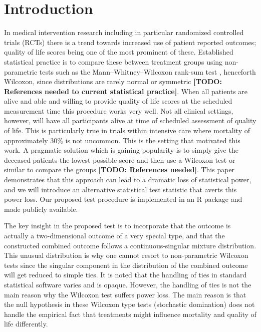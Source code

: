 \section{Introduction}

In medical intervention research including in particular randomized controlled trials (RCTs) there is a trend towards increased use of patient reported outcomes; quality of life scores being one of the most prominent of these. Established statistical practice is to compare these between treatment groups using non-parametric tests such as the Mann--Whitney--Wilcoxon rank-sum test \citep{wilcoxon3001968individual,mann1947test}, henceforth Wilcoxon, since distributions are rarely normal or symmetric \textbf{[TODO: References needed to current statistical practice]}. When all patients are alive and able and willing to provide quality of life scores at the scheduled measurement time this procedure works very well. Not all clinical settings, however, will have all participants alive at time of scheduled assessment of quality of life. This is particularly true in trials within intensive care where mortality of approximately 30\% is not uncommon. This is the setting that motivated this work. A pragmatic solution which is gaining popularity is to simply give the deceased patients the lowest possible score and then use a Wilcoxon test or similar to compare the groups \textbf{[TODO: References needed]}. This paper demonstrates that this approach can lead to a dramatic loss of statistical power, and we will introduce an alternative statistical test statistic that averts this power loss. Our proposed test procedure is implemented in an R package and made publicly available.

The key insight in the proposed test is to incorporate that the outcome is actually a two-dimensional outcome of a very special type, and that the constructed combined outcome follows a continuous-singular mixture distribution. This unusual distribution is why one cannot resort to non-parametric Wilcoxon tests since the singular component in the distribution of the combined outcome will get reduced to simple ties. It is noted that the handling of ties in standard statistical software varies and is opaque. However, the handling of ties is not the main reason why the Wilcoxon test suffers power loss. The main reason is that the null hypothesis in these Wilcoxon type tests (stochastic domination) does not handle the empirical fact that treatments might influence mortality and quality of life differently.

